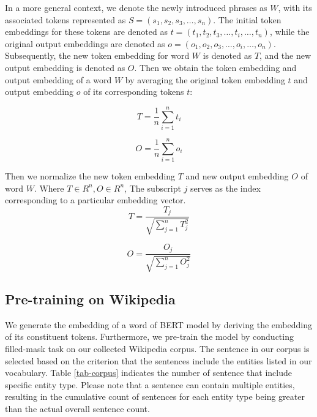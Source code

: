 \documentclass[]{ceurart}
\begin{document}
In a more general context, we denote the newly introduced phrases as $W$, with its associated tokens represented as $S=(s_1, s_2, s_3, \ldots, s_n)$. The initial token embeddings for these tokens are denoted as $t=(t_1, t_2, t_3, \ldots, t_i, \ldots, t_n)$, while the original output embeddings are denoted as $o=(o_1, o_2, o_3, \ldots, o_i, \ldots, o_n)$. Subsequently, the new token embedding for word $W$ is denoted as $T$, and the new output embedding is denoted as $O$.
Then we obtain the token embedding and output embedding of a word $W$ by averaging the original token embedding $t$ and output embedding $o$ of its corresponding tokens $t$:

\begin{equation}
T =  \frac{1}{n}\sum_{i=1}^n t_i 
\end{equation}

\begin{equation}
O =  \frac{1}{n}\sum_{i=1}^n o_i 
\end{equation}

Then we normalize the new token embedding $T$ and new output embedding $O$ of word $W$. Where $T \in R^{n}, O \in R^{n} $, The subscript $j$ serves as the index corresponding to a particular embedding vector. 
\begin{equation}
T =  \frac{T_j}{\sqrt{\sum_{j=1}^n T_j ^ 2}}
\end{equation}

\begin{equation}
O =  \frac{O_j}{\sqrt{\sum_{j=1}^n O_j ^ 2}}
\end{equation}

\subsection{Pre-training on Wikipedia }
We generate the embedding of a word of BERT model by deriving the embedding of its constituent tokens. Furthermore, we pre-train the model by conducting filled-mask task on our collected Wikipedia corpus. The sentence in our corpus is selected based on the criterion that the sentences include the entities listed in our vocabulary. Table \ref{tab-corpus} indicates the number of sentence that include specific entity type. Please note that a sentence can contain multiple entities, resulting in the cumulative count of sentences for each entity type being greater than the actual overall sentence count.
\end{document}
